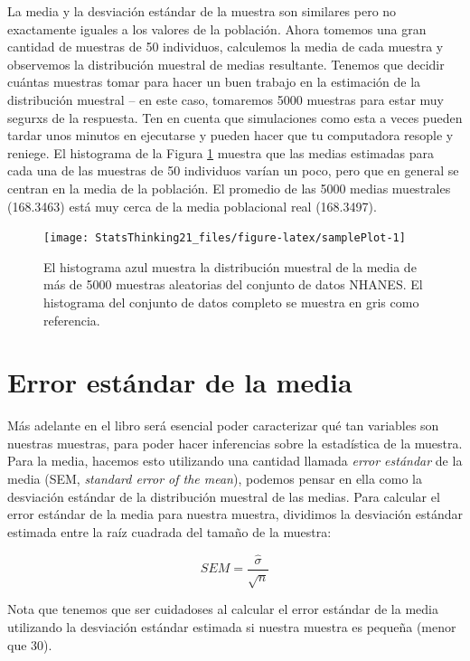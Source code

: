 \documentclass[
  12pt,
]{book}
\begin{document}
La media y la desviación estándar de la muestra son similares pero no exactamente iguales a los valores de la población. Ahora tomemos una gran cantidad de muestras de 50 individuos, calculemos la media de cada muestra y observemos la distribución muestral de medias resultante. Tenemos que decidir cuántas muestras tomar para hacer un buen trabajo en la estimación de la distribución muestral -- en este caso, tomaremos 5000 muestras para estar muy segurxs de la respuesta. Ten en cuenta que simulaciones como esta a veces pueden tardar unos minutos en ejecutarse y pueden hacer que tu computadora resople y reniege. El histograma de la Figura \ref{fig:samplePlot} muestra que las medias estimadas para cada una de las muestras de 50 individuos varían un poco, pero que en general se centran en la media de la población. El promedio de las 5000 medias muestrales (168.3463) está muy cerca de la media poblacional real (168.3497).

\begin{figure}
\texttt{[image: StatsThinking21\_files/figure-latex/samplePlot-1]} \caption{El histograma azul muestra la distribución muestral de la media de más de 5000 muestras aleatorias del conjunto de datos NHANES. El histograma del conjunto de datos completo se muestra en gris como referencia.}\label{fig:samplePlot}
\end{figure}

\hypertarget{standard-error-of-the-mean}{%
\section{Error estándar de la media}\label{standard-error-of-the-mean}}

Más adelante en el libro será esencial poder caracterizar qué tan variables son nuestras muestras, para poder hacer inferencias sobre la estadística de la muestra. Para la media, hacemos esto utilizando una cantidad llamada \emph{error estándar} de la media (SEM, \emph{standard error of the mean}), podemos pensar en ella como la desviación estándar de la distribución muestral de las medias. Para calcular el error estándar de la media para nuestra muestra, dividimos la desviación estándar estimada entre la raíz cuadrada del tamaño de la muestra:

\[
SEM = \frac{\hat{\sigma}}{\sqrt{n}}
\]

Nota que tenemos que ser cuidadoses al calcular el error estándar de la media utilizando la desviación estándar estimada si nuestra muestra es pequeña (menor que 30).
\end{document}
